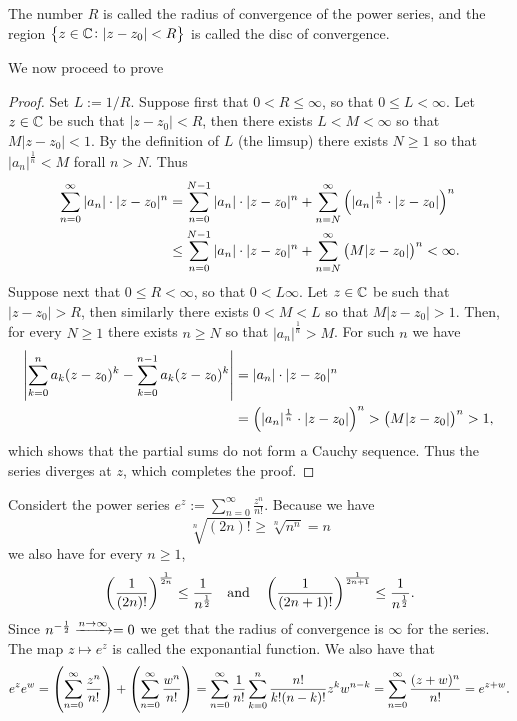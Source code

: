 \documentclass[11pt,a4paper]{article}
\begin{document}
\begin{remark}
  The number $R$ is called the radius of convergence of the power series,
  and the region $\set{z \in \mathbb{C}\colon |z - z_0| < R}$ is called the disc
  of convergence.
\end{remark}

We now proceed to prove 

\begin{proof}
  Set $L := 1/R$.
  Suppose first that $0 < R \le \infty$, so that $0 \le L < \infty$.
  Let $z \in \mathbb{C}$ be such that $|z - z_0| < R$, then there exists
  $L < M < \infty$ so that $M |z - z_0| < 1$.
  By the definition of $L$ (the limsup) there exists $N \geq 1$ so that
  $|a_n|^{\frac 1n} < M$ forall $n > N$. Thus
  \begin{align*}
    \sum_{n=0}^{\infty} |a_n| \cdot |z - z_0|^n &=
    \sum_{n=0}^{N-1} |a_n| \cdot |z - z_0|^n +
    \sum_{n=N}^{\infty} \del{|a_n|^{\frac 1n} \cdot |z - z_0|}^n \\ &\le
    \sum_{n=0}^{N-1} |a_n| \cdot |z - z_0|^n +
    \sum_{n=N}^{\infty} \del{M |z - z_0|}^n <
    \infty.
  \end{align*}
  Suppose next that $0 \le R < \infty$, so that $0 < L \infty$.
  Let $z \in \mathbb{C}$ be such that $|z - z_0| > R$, then similarly there
  exists $0 < M < L$ so that $M |z - z_0| > 1$.
  Then, for every $N \geq 1$ there exists $n \geq N$ so that 
  $|a_n|^{\frac 1n} > M$.
  For such $n$ we have
  \begin{align*}
    \abs{\sum_{k=0}^{n} a_k(z-z_0)^k - \sum_{k=0}^{n-1} a_k(z-z_0)^k} &=
    |a_n| \cdot |z - z_0|^n \\ &=
    \del{|a_n|^{\frac 1n} \cdot |z - z_0|}^n >
    \del{M |z - z_0|}^n > 1,
  \end{align*}
  which shows that the partial sums do not form a Cauchy sequence.
  Thus the series diverges at $z$, which completes the proof.
\end{proof}

\begin{example}
  Considert the power series $e^z := \sum_{n=0}^{\infty} \frac{z^n}{n!}$.
  Because we have
  \[
    \sqrt[n]{(2n)!} \geq \sqrt[n]{n^n} = n
  \]
  we also have for every $n \geq 1$,
  \[
    \del{\frac{1}{(2n)!}}^{\frac{1}{2n}} \le \frac{1}{n^{\half}}
    \tand
    \del{\frac{1}{(2n+1)!}}^{\frac{1}{2n+1}} \le \frac{1}{n^{\half}}.
  \]
  Since $n^{-\frac{1}{2}} \xrightarrow{n \to \infty} = 0$ we get that the radius of
  convergence is $\infty$ for the series.
  The map $z \mapsto e^z$ is called the exponantial function.
  We also have that
  \begin{align*}
    e^z e^w =
    \del{\sum_{n=0}^{\infty} \frac{z^n}{n!}} +
    \del{\sum_{n=0}^{\infty} \frac{w^n}{n!}} =
    \sum_{n=0}^{\infty}
    \frac{1}{n!} \sum_{k=0}^{n} \frac{n!}{k!(n-k)!} z^k w^{n-k} =
    \sum_{n=0}^{\infty} \frac{(z+w)^n}{n!} =
    e^{z + w}.
  \end{align*}
\end{example}
\end{document}
